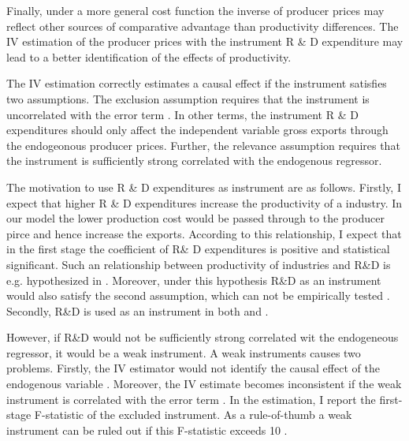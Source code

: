 Finally, under a more general cost function the inverse of producer prices may reflect other sources of comparative advantage than productivity differences.
The IV estimation of the producer prices with the instrument R \& D expenditure may lead to a better identification of the effects of productivity.
 \par
The IV estimation correctly estimates a causal effect  if the instrument satisfies  two assumptions.
The exclusion assumption requires that the instrument is uncorrelated with the error term \parencite{cameron2009}.
In other terms, the instrument R \& D expenditures should only affect the independent variable gross exports through the endogeonous producer prices.
Further, the relevance assumption requires that  the instrument is sufficiently strong correlated with the endogenous regressor.
 \par%
 The motivation to use  R \& D expenditures as instrument are as follows.
 Firstly, I expect that higher R \& D expenditures
 increase the productivity of a industry.
 In our model the lower production cost would be passed through to the producer pirce and hence increase the exports.
 According to this relationship, I expect that in the first stage the coefficient of R\& D expenditures is positive and statistical significant.
 Such an relationship between productivity of industries and R\&D is e.g. hypothesized in \textcite{Griffith-R_D-2004}.
 Moreover, under this hypothesis R\&D as an instrument would also satisfy the second assumption, which can not be empirically tested \parencite[p.109]{cameron2009}.
Secondly, R\&D is used as an instrument in both \textcite{costinot} and \textcite{eaton}. \par
However, if R\&D would not be sufficiently strong correlated wit the endogeneous regressor, it
would be a weak instrument.
A weak instruments causes two problems. Firstly, the IV estimator would not
 identify the causal effect of the endogenous variable  \parencite{bound}.
Moreover,  the IV estimate becomes inconsistent if the weak instrument is correlated with the error term \parencite{bound}.
In the estimation, I report the first-stage F-statistic of the excluded instrument.
As a rule-of-thumb a weak instrument can be ruled out if this F-statistic exceeds 10 \parencite{Stock-Staiger}.   \par

